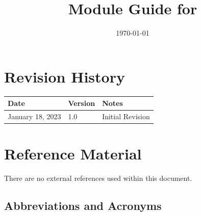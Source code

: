 \documentclass[12pt, titlepage]{article}
\begin{document}
\title{Module Guide for \progname{}} 
\author{\authname}
\date{\today}

\maketitle


\section{Revision History}

\begin{tabularx}{\textwidth}{p{3cm}p{2cm}X}
\toprule {\bf Date} & {\bf Version} & {\bf Notes}\\
\midrule
January 18, 2023 & 1.0 & Initial Revision\\
\bottomrule
\end{tabularx}

\newpage

\section{Reference Material}

There are no external references used within this document.

\subsection{Abbreviations and Acronyms}
\end{document}
